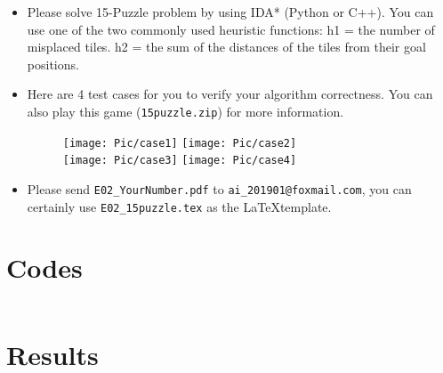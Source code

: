 \documentclass[a4paper, 11pt]{article}
\begin{document}
\begin{itemize}
	\item Please solve 15-Puzzle problem by using IDA* (Python or C++). You can use one of the two commonly used heuristic functions: h1 = the number of misplaced tiles. h2 = the sum of the distances of the tiles from their goal positions. 
	\item Here are 4 test cases for you to verify your algorithm correctness. You can also play this game (\texttt{15puzzle.zip}) for more information.
	\begin{figure}[ht]
	\centering
	\texttt{[image: Pic/case1]}
	\quad
	\texttt{[image: Pic/case2]}
	\\
	\texttt{[image: Pic/case3]}
	\quad
	\texttt{[image: Pic/case4]}
	
	\end{figure}
	\item Please send \texttt{E02\_YourNumber.pdf} to \texttt{ai\_201901@foxmail.com}, you can certainly use \texttt{E02\_15puzzle.tex} as the \LaTeX template.
\end{itemize}


\section{Codes}
\lstset{language=C++}
\begin{lstlisting}

\end{lstlisting}
\section{Results}
\begin{figure}
\centering
\end{figure}


%
%
\end{document}
